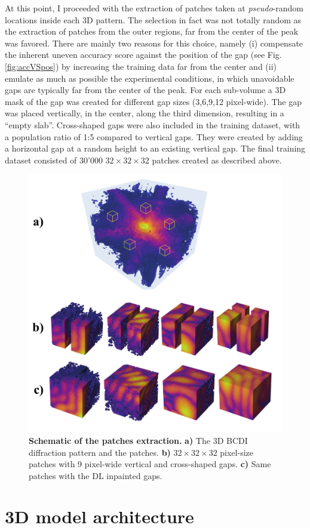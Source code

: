At this point, I proceeded with the extraction of patches taken at \textit{pseudo}-random locations inside each 3D pattern. 
The selection in fact was not totally random as the extraction of patches from the outer regions, far from the 
center of the peak was favored. There are mainly two reasons for this choice, namely (i) compensate the inherent uneven accuracy score against
the position of the gap (see Fig.\ref{fig:accVSpos}) by increasing the training data far from the center and (ii) emulate
as much as possible the experimental conditions, in which unavoidable gaps are typically far from the center of the peak.
For each sub-volume a 3D mask of the gap was created for different gap sizes (3,6,9,12 pixel-wide). The gap was placed 
vertically, in the center, along the third dimension, resulting in a ``empty slab''. Cross-shaped gaps were also 
included in the training dataset, with a population ratio of 1:5 compared to vertical gaps. They were created by 
adding a horizontal gap at a random height to an existing vertical gap.
The final training dataset consisted of 30'000 $32\times32\times32$ patches created as described above. 

\begin{figure}[h]
    \centering
    \includegraphics[width=.6\textwidth]{figures/Inpainting/process.pdf}
    \caption{\textbf{Schematic of the patches extraction.} \textbf{a)} The 3D BCDI diffraction pattern and the 
    patches. \textbf{b)} $32\times32\times32$ pixel-size patches with 9 pixel-wide vertical and cross-shaped gaps.
    \textbf{c)} Same patches with the DL inpainted gaps.}
    \label{fig:patches_method}
\end{figure}

\section{3D model architecture}

